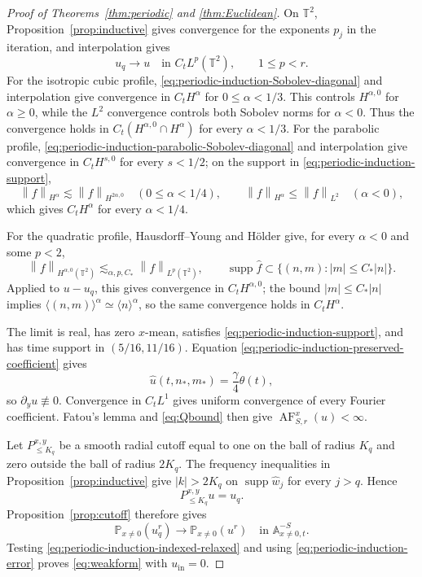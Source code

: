 \documentclass[12pt,reqno,letterpaper]{amsart}
\numberwithin{equation}{section}
\theoremstyle{definition}
\newcommand{\T}{\mathbb T}
\newcommand{\A}{\mathbb A}
\newcommand{\supp}{\operatorname{supp}}
\newcommand{\norm}[1]{\left\lVert #1\right\rVert}
\newcommand{\abs}[1]{\left\lvert #1\right\rvert}
\begin{document}
\begin{proof}[Proof of Theorems~\ref{thm:periodic} and
\ref{thm:Euclidean}]
On $\T^2$, Proposition~\ref{prop:inductive} gives convergence for the
exponents $p_j$ in the iteration, and interpolation gives
\[
 u_q\longrightarrow u\quad\text{in }C_tL^p(\T^2),
 \qquad 1\leq p<r.
\]
For the isotropic cubic profile,
\eqref{eq:periodic-induction-Sobolev-diagonal} and interpolation give convergence in
$C_tH^\alpha$ for $0\leq\alpha<1/3$.  This controls $H^{\alpha,0}$
for $\alpha\geq0$, while the $L^2$ convergence controls both Sobolev
norms for $\alpha<0$.  Thus the convergence holds in
$C_t(H^{\alpha,0}\cap H^\alpha)$ for every $\alpha<1/3$.  For the
parabolic profile,
\eqref{eq:periodic-induction-parabolic-Sobolev-diagonal} and interpolation give convergence
in $C_tH^{s,0}$ for every $s<1/2$; on the support in
\eqref{eq:periodic-induction-support},
\[
 \norm f_{H^\alpha}\lesssim\norm f_{H^{2\alpha,0}}
 \quad(0\leq\alpha<1/4),
 \qquad
 \norm f_{H^\alpha}\leq\norm f_{L^2}
 \quad(\alpha<0),
\]
which gives $C_tH^\alpha$ for every $\alpha<1/4$.

For the quadratic profile, Hausdorff--Young and H\"older give, for every
$\alpha<0$ and some $p<2$,
\begin{equation}\label{eq:periodic-induction-negative-Sobolev}
 \norm f_{H^{\alpha,0}(\T^2)}
 \lesssim_{\alpha,p,C_*}\norm f_{L^p(\T^2)},
 \qquad
 \supp\widehat f\subset
 \{(n,m):\abs m\leq C_*\abs n\}.
\end{equation}
Applied to $u-u_q$, this gives convergence in $C_tH^{\alpha,0}$; the
bound $\abs m\leq C_*\abs n$ implies
$\langle(n,m)\rangle^\alpha\simeq\langle n\rangle^\alpha$, so the same
convergence holds in $C_tH^\alpha$.

The limit is real, has zero $x$-mean, satisfies
\eqref{eq:periodic-induction-support}, and has time support in
$(5/16,11/16)$.  Equation
\eqref{eq:periodic-induction-preserved-coefficient} gives
\[
 \widehat u(t,n_*,m_*)=\frac\gamma4\theta(t),
\]
so $\partial_yu\not\equiv0$.  Convergence in $C_tL^1$ gives uniform
convergence of every Fourier coefficient.  Fatou's lemma and
\eqref{eq:Qbound} then give
$\operatorname{AF}_{S,r}^x(u)<\infty$.

Let $P_{\leq K_q}^{x,y}$ be a smooth radial cutoff equal to one on the
ball of radius $K_q$ and zero outside the ball of radius $2K_q$.
The frequency inequalities in Proposition~\ref{prop:inductive} give
$\abs k>2K_q$ on $\supp\widehat w_j$ for every $j>q$.  Hence
\[
 P_{\leq K_q}^{x,y}u=u_q.
\]
Proposition~\ref{prop:cutoff} therefore gives
\[
 \mathbb P_{x\neq0}(u_q^r)
 \longrightarrow\mathbb P_{x\neq0}(u^r)
 \quad\text{in }\A^{-S}_{x\neq0,t}.
\]
Testing \eqref{eq:periodic-induction-indexed-relaxed} and using
\eqref{eq:periodic-induction-error} proves \eqref{eq:weakform} with
$u_{\mathrm{in}}=0$.


\end{proof}
\end{document}
